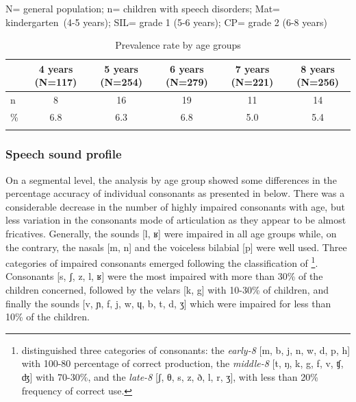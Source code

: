 \documentclass[output=paper,newtxmath,modfonts,nonflat,draftmode]{langsci/langscibook}
\begin{document}
N= general population; n= children with speech disorders; Mat= kindergarten~(4-5 years); SIL= grade 1 (5-6 years); CP= grade 2 (6-8 years)

\begin{table}
\caption{Prevalence rate by age groups}
\begin{tabularx}{\textwidth}{XSSSSS}
\lsptoprule
& { 4 years}  (N=117) &  5 years (N=254) &  6 years (N=279) &  7 years (N=221) &  8 years (N=256)\\
\midrule
n & 8 & 16 & 19 & 11 & 14\\
{\%} & 6.8 & 6.3 & 6.8 & 5.0 & 5.4\\
\lspbottomrule
\end{tabularx}
\label{tab:takam:4}
\end{table}


\subsubsection{Speech sound profile }%

On a segmental level, {the analysis by age group showed some differences in the percentage accuracy of individual consonants} as presented in  below. There was a considerable decrease in the number of highly impaired consonants with age, but less variation in the consonants mode of articulation as they appear to be almost fricatives. {Generally, t}he sounds [l, ʁ] were impaired in all age groups while, on the contrary, the nasals [m, n] and the voiceless bilabial [p] were well used. Three categories of impaired consonants emerged following the classification of \citet{Shriberg1994}\footnote{\citet{Shriberg1994} distinguished three categories of consonants: the \textit{early-8} [m, b, j, n, w, d, p, h] with 100-80 percentage of correct production, the \textit{middle-8} [t, ŋ, k, g, f, v, ʧ, ʤ] with 70-30\%, and the \textit{late-8} [ʃ, θ, s, z, ð, l, r, ʒ], with less than 20\% frequency of correct use.}. Consonants [s, ʃ, z, l, ʁ] were the most impaired with more than 30\% of the children concerned, followed by the velars [k, g] with 10-30\% of children, and finally the sounds [v, ɲ, f, j, w, ɥ, b, t, d, ʒ] which were impaired for less than 10\% of the children. 
\end{document}
